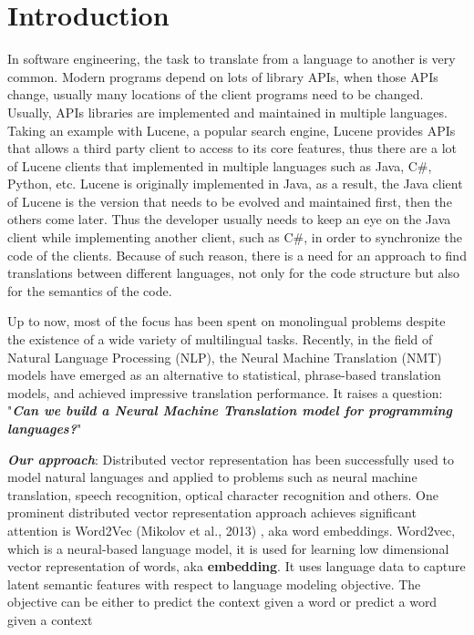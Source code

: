 \section{Introduction}

In software engineering, the task to translate from a language to another is very common. Modern programs depend on lots of library APIs, when those APIs change, usually many locations of the client programs need to be changed. Usually, APIs libraries are implemented and maintained in multiple languages. Taking an example with Lucene, a popular search engine, Lucene provides APIs that allows a third party client to access to its core features, thus there are a lot of Lucene clients that implemented in multiple languages such as Java, C\#, Python, etc. Lucene is originally implemented in Java, as a result, the Java client of Lucene is the version that needs to be evolved and maintained first, then the others come later. Thus the developer usually needs to keep an eye on the Java client while implementing another client, such as C\#, in order to synchronize the code of the clients. Because of such reason, there is a need for an approach to find translations between different languages, not only for the code structure but also for the semantics of the code.

Up to now, most of the focus has been spent on monolingual problems despite the existence of a wide variety of multilingual tasks. Recently, in the field of Natural Language Processing (NLP), the Neural Machine Translation (NMT) models have emerged as an alternative to statistical, phrase-based translation models, and achieved impressive translation performance. It raises a question: "\textbf{\textit{Can we build a Neural Machine Translation model for programming languages?}}"

\textbf{\textit{Our approach}}: Distributed vector representation has been successfully used to model natural languages and applied to problems such as neural machine translation, speech recognition, optical character recognition and others. One prominent distributed vector representation approach achieves significant attention is Word2Vec (Mikolov et al., 2013) \cite{mikolov2013distributed}, aka word embeddings. Word2vec, which is a neural-based language model, it is used for learning low dimensional vector representation of words, aka \textbf{embedding}. It uses language data to capture latent semantic features with respect to language modeling objective. The objective can be either to predict the context given a word or predict a word given a context


